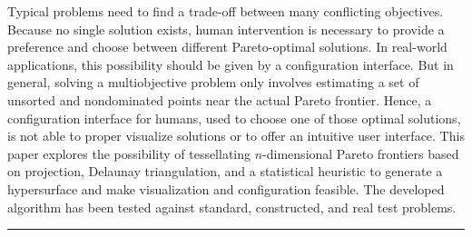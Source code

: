 \documentclass{stdlocal}
\begin{document}
  Typical problems need to find a trade-off between many conflicting objectives.
  Because no single solution exists, human intervention is necessary to provide a preference and choose between different Pareto-optimal solutions.
  In real-world applications, this possibility should be given by a configuration interface.
  But in general, solving a multiobjective problem only involves estimating a set of unsorted and nondominated points near the actual Pareto frontier.
  Hence, a configuration interface for humans, used to choose one of those optimal solutions, is not able to proper visualize solutions or to offer an intuitive user interface.
  This paper explores the possibility of tessellating $n$-dimensional Pareto frontiers based on projection, Delaunay triangulation, and a statistical heuristic to generate a hypersurface and make visualization and configuration feasible.
  The developed algorithm has been tested against standard, constructed, and real test problems.
\bigskip
\hrule
\bigskip
\end{document}
